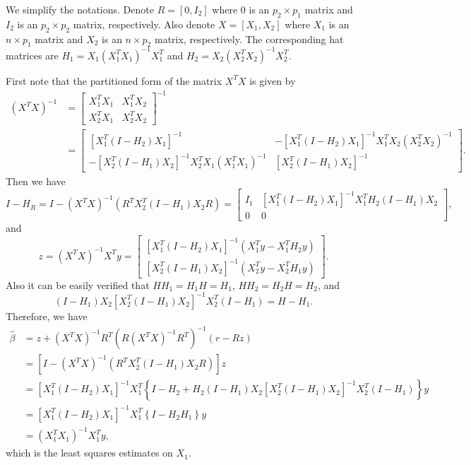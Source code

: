 We simplify the notations. Denote $R=[0, I_2]$ where $0$ is an $p_2 \times p_1$ matrix and $I_2$ is an $p_2 \times p_2$ matrix, respectively. Also denote $X=[X_1, X_2]$ where $X_1$ is an $n \times p_1$ matrix and $X_2$ is an $n \times p_2$ matrix, respectively. The corresponding hat matrices are $H_1 = X_1 (X_1^T X_1)^{-1} X_1^T$ and $H_2 = X_2 (X_2^T X_2)^{-1} X_2^T$. 

First note that the partitioned form of the matrix $X^T X$ is given by
\begin{equation}
\begin{aligned}
(X^T X)^{-1} &= 
\begin{bmatrix}
X_1^T X_1 & X_1^T X_2 \\
X_2^T X_1 & X_2^T X_2
\end{bmatrix}^{-1} \\
&=
\begin{bmatrix}
[X_1^T (I-H_2) X_1 ]^{-1} & - [X_1^T (I-H_2) X_1 ]^{-1} X_1^T X_2 (X_2^T X_2)^{-1}\\
- [X_2^T (I-H_1) X_2 ]^{-1} X_2^T X_1 (X_1^T X_1)^{-1} & [X_2^T (I-H_1) X_2 ]^{-1}
\end{bmatrix}.
\end{aligned}
\end{equation}
Then we have
\begin{equation*}
I - H_R=
I - (X^T X)^{-1}(R^T X_2^T (I-H_1) X_2 R) =
\begin{bmatrix}
I_1 & [X_1^T (I-H_2) X_1 ]^{-1} X_1^T H_2 (I-H_1) X_2 \\
0 & 0
\end{bmatrix},
\end{equation*}
and
\begin{equation*}
z = (X^T X)^{-1} X^T y = 
\begin{bmatrix}
[X_1^T (I-H_2) X_1 ]^{-1} (X_1^T y - X_1^T H_2 y)\\
[X_2^T (I-H_1) X_2 ]^{-1} (X_2^T y - X_2^T H_1 y)
\end{bmatrix}.
\end{equation*}
Also it can be easily verified that $HH_1=H_1H=H_1$, $HH_2=H_2H=H_2$, and
\begin{equation*}
(I-H_1)X_2 [X_2^T (I-H_1) X_2 ]^{-1} X_2^T (I-H_1) = H - H_1.
\end{equation*}
Therefore, we have
\begin{equation*}
\begin{aligned}
  \hat{\beta} &= z + (X^T X)^{-1} R^T ( R(X^T X)^{-1} R^T)^{-1} (r-R z) \\
  &= \left[ I
   - (X^T X)^{-1}(R^T X_2^T (I-H_1) X_2 R) \right] z\\
  &= [X_1^T (I-H_2) X_1 ]^{-1} X_1^T \left\{ I-H_2+H_2(I-H_1)X_2 [X_2^T (I-H_1) X_2 ]^{-1} X_2^T (I-H_1)  \right\}y \\
  &= [X_1^T (I-H_2) X_1 ]^{-1} X_1^T \left\{ I-H_2H_1 \right\}y\\
  &= (X_1^T X_1)^{-1} X_1^T y,
\end{aligned}
\end{equation*}
which is the least squares estimates on $X_1$.

